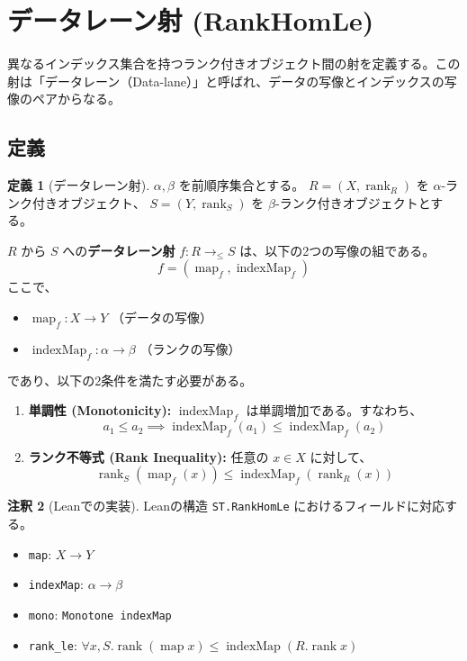 \documentclass[11pt, a4paper]{article}
\theoremstyle{definition}
\newtheorem{definition}{定義}[section]
\newtheorem{remark}[definition]{注釈}
\newcommand{\code}[1]{\texttt{#1}}
\newcommand{\rank}{\operatorname{rank}}
\newcommand{\map}{\operatorname{map}}
\newcommand{\indexMap}{\operatorname{indexMap}}
\begin{document}
\section{データレーン射 (RankHomLe)}
\label{sec:rankhomle}

異なるインデックス集合を持つランク付きオブジェクト間の射を定義する。この射は「データレーン（Data-lane）」と呼ばれ、データの写像とインデックスの写像のペアからなる。

\subsection{定義}

\begin{definition}[データレーン射]
$\alpha, \beta$ を前順序集合とする。
$R = (X, \rank_R)$ を $\alpha$-ランク付きオブジェクト、
$S = (Y, \rank_S)$ を $\beta$-ランク付きオブジェクトとする。

$R$ から $S$ への\textbf{データレーン射} $f : R \to_{\le} S$ は、以下の2つの写像の組である。
\[
  f = (\map_f, \indexMap_f)
\]
ここで、
\begin{itemize}
    \item $\map_f : X \to Y$ （データの写像）
    \item $\indexMap_f : \alpha \to \beta$ （ランクの写像）
\end{itemize}
であり、以下の2条件を満たす必要がある。
\begin{enumerate}
    \item \textbf{単調性 (Monotonicity):} $\indexMap_f$ は単調増加である。すなわち、
    \[ a_1 \le a_2 \implies \indexMap_f(a_1) \le \indexMap_f(a_2) \]
    \item \textbf{ランク不等式 (Rank Inequality):} 任意の $x \in X$ に対して、
    \[ \rank_S(\map_f(x)) \le \indexMap_f(\rank_R(x)) \]
\end{enumerate}
\end{definition}

\begin{remark}[Leanでの実装]
Leanの構造 \code{ST.RankHomLe} におけるフィールドに対応する。
\begin{itemize}
    \item \code{map}: $X \to Y$
    \item \code{indexMap}: $\alpha \to \beta$
    \item \code{mono}: \code{Monotone indexMap}
    \item \code{rank\_le}: $\forall x, S.\rank (\map x) \le \indexMap (R.\rank x)$
\end{itemize}
\end{remark}
\end{document}
